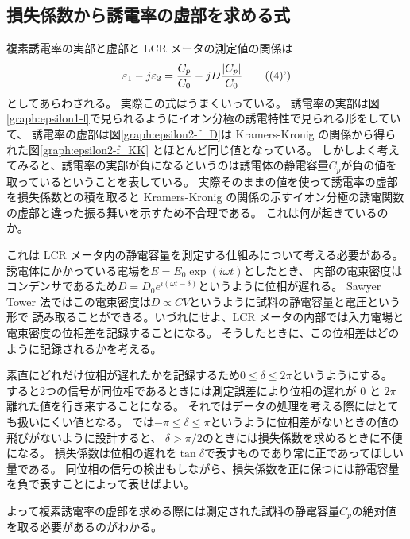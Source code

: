 \documentclass[9pt,dvipdfmx,a4paper]{jsarticle}
\begin{document}
\subsection{損失係数から誘電率の虚部を求める式}
複素誘電率の実部と虚部と LCR メータの測定値の関係は
\begin{align*}
    \varepsilon_1 - j\varepsilon_2 = \frac{C_p}{C_0}-jD\frac{\abs{C_p}}{C_0} \tag{(4)'}
\end{align*}
としてあらわされる。
実際この式はうまくいっている。
誘電率の実部は図\ref{graph:epsilon1-f}で見られるようにイオン分極の誘電特性で見られる形をしていて、
誘電率の虚部は図\ref{graph:epsilon2-f_D}は Kramers-Kronig の関係から得られた図\ref{graph:epsilon2-f_KK}
とほとんど同じ値となっている。
しかしよく考えてみると、誘電率の実部が負になるというのは誘電体の静電容量\(C_p\)が負の値を取っているということを表している。
実際そのままの値を使って誘電率の虚部を損失係数との積を取ると
Kramers-Kronig の関係の示すイオン分極の誘電関数の虚部と違った振る舞いを示すため不合理である。
これは何が起きているのか。

これは LCR メータ内の静電容量を測定する仕組みについて考える必要がある。
誘電体にかかっている電場を\(E=E_0\exp(i\omega t)\)としたとき、
内部の電束密度はコンデンサであるため\(D=D_0e^{i(\omega t - \delta)}\)というように位相が遅れる。
Sawyer Tower 法ではこの電束密度は\(D \propto CV\)というように試料の静電容量と電圧という形で
読み取ることができる。いづれにせよ、LCR メータの内部では入力電場と電束密度の位相差を記録することになる。
そうしたときに、この位相差はどのように記録されるかを考える。

素直にどれだけ位相が遅れたかを記録するため\(0\leq \delta \leq 2\pi\)というようにする。
すると2つの信号が同位相であるときには測定誤差により位相の遅れが 0 と \(2\pi\)離れた値を行き来することになる。
それではデータの処理を考える際にはとても扱いにくい値となる。
では\(-\pi\leq\delta\leq\pi\)というように位相差がないときの値の飛びがないように設計すると、
\(\delta>\pi/2\)のときには損失係数を求めるときに不便になる。
損失係数は位相の遅れを\(\tan \delta\)で表すものであり常に正であってほしい量である。
同位相の信号の検出もしながら、損失係数を正に保つには静電容量を負で表すことによって表せばよい。

よって複素誘電率の虚部を求める際には測定された試料の静電容量\(C_p\)の絶対値を取る必要があるのがわかる。
\end{document}

